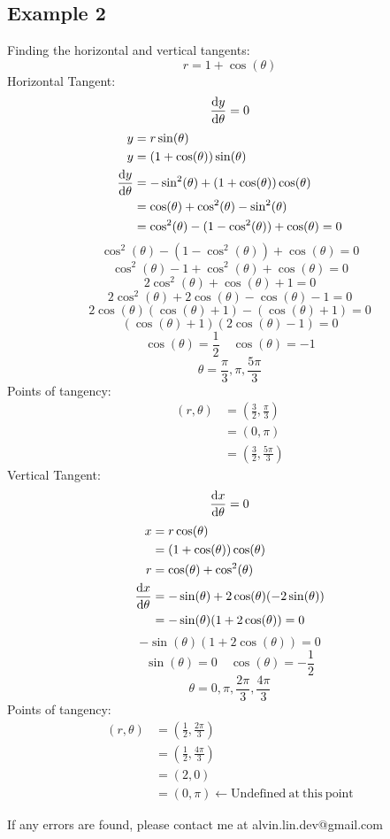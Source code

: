 \documentclass[letterpaper, 12pt]{math}
\begin{document}
\subsection*{Example 2}
Finding the horizontal and vertical tangents:
\[ r = 1+\cos(\theta) \]
Horizontal Tangent:
\[ \frac{\mathrm{d}{y}}{\mathrm{d}{\theta}} = 0 \]
\begin{align*}
  y &= r\sin(\theta) \\
  y &= (1+\cos(\theta))\sin(\theta) \\
  \frac{\mathrm{d}{y}}{\mathrm{d}{\theta}} &=
    -\sin^{2}(\theta)+(1+\cos(\theta))\cos(\theta) \\
  &= \cos(\theta)+\cos^{2}(\theta)-\sin^{2}(\theta) \\
  &= \cos^{2}(\theta)-(1-\cos^{2}(\theta))+\cos(\theta) = 0 \\
\end{align*}
\[ \cos^{2}(\theta)-(1-\cos^{2}(\theta))+\cos(\theta) = 0 \]
\[ \cos^{2}(\theta)-1+\cos^{2}(\theta)+\cos(\theta) = 0 \]
\[ 2\cos^{2}(\theta)+\cos(\theta)+1 = 0 \]
\[ 2\cos^{2}(\theta)+2\cos(\theta)-\cos(\theta)-1 = 0 \]
\[ 2\cos(\theta)(\cos(\theta)+1)-(\cos(\theta)+1) = 0 \]
\[ (\cos(\theta)+1)(2\cos(\theta)-1) = 0 \]
\[ \cos(\theta) = \frac{1}{2} \quad \cos(\theta) = -1 \]
\[ \theta = \frac{\pi}{3},\pi,\frac{5\pi}{3} \]
Points of tangency:
\begin{align*}
  (r,\theta) &= (\frac{3}{2},\frac{\pi}{3}) \\
  &= (0,\pi) \\
  &= (\frac{3}{2},\frac{5\pi}{3})
\end{align*}
Vertical Tangent:
\[ \frac{\mathrm{d}{x}}{\mathrm{d}{\theta}} = 0 \]
\begin{align*}
  x &= r\cos(\theta) \\
  &= (1+\cos(\theta))\cos(\theta) \\
  r &= \cos(\theta)+\cos^{2}(\theta) \\
  \frac{\mathrm{d}{x}}{\mathrm{d}{\theta}} &=
    -\sin(\theta)+2\cos(\theta)(-2\sin(\theta)) \\
  &= -\sin(\theta)(1+2\cos(\theta)) = 0
\end{align*}
\[ -\sin(\theta)(1+2\cos(\theta)) = 0 \]
\[ \sin(\theta) = 0 \quad \cos(\theta) = -\frac{1}{2} \]
\[ \theta = 0,\pi,\frac{2\pi}{3},\frac{4\pi}{3} \]
Points of tangency:
\begin{align*}
  (r,\theta) &= (\frac{1}{2},\frac{2\pi}{3}) \\
  &= (\frac{1}{2},\frac{4\pi}{3}) \\
  &= (2,0) \\
  &= (0,\pi) \leftarrow \mathrm{Undefined\ at\ this\ point}
\end{align*}

\begin{center}
  If any errors are found, please contact me at alvin.lin.dev@gmail.com
\end{center}
\end{document}
